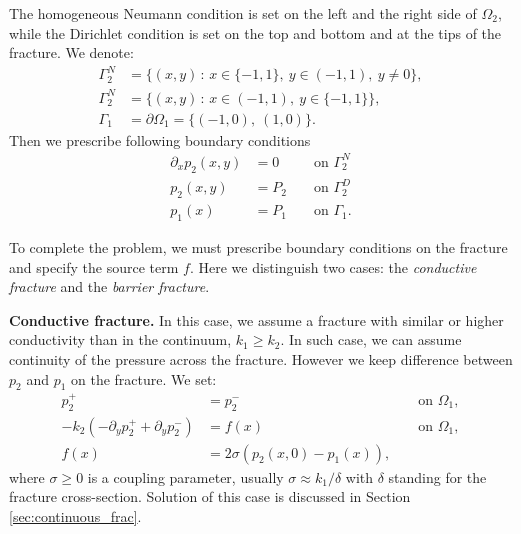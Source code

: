 \documentclass{elsarticle}
\def\prtl{\partial} %
\begin{document}
The homogeneous Neumann condition is set on the left and the right side of $\Omega_2$,
while the Dirichlet condition is set on the top and bottom and at the tips of the fracture.
We denote:
\begin{align*}
   \Gamma^N_2 &= \{(x,y)\, :\, x\in\{-1, 1\},\ y\in (-1, 1),\ y\ne 0\},\\
   \Gamma^N_2 &= \{(x,y)\, :\, x\in (-1, 1),\ y\in \{-1, 1\}\},\\
   \Gamma_1   &= \prtl \Omega_1 = \{(-1, 0),\ (1, 0)\}. 
\end{align*}
Then we prescribe following boundary conditions
\begin{align}
  \label{eq:bc_common}
  \prtl_x p_2(x,y) &= 0  &&\text{ on } \Gamma_2^N\\
  p_2(x,y) &= P_2        &&\text{ on } \Gamma_2^D\\
  p_1(x) &= P_1          &&\text{ on } \Gamma_1.
  \label{eq:bc_1}
\end{align}

To complete the problem, we must prescribe boundary conditions on the fracture and specify the source term $f$. Here we 
distinguish two cases: the \emph{conductive fracture} and the \emph{barrier fracture}.


{\bf Conductive fracture.} In this case, we assume a fracture with similar or higher conductivity than in the continuum, $k_1 \ge k_2$.
In such case, we can assume continuity of the pressure across the fracture. However we keep difference between $p_2$ and $p_1$ on the fracture.
We set:
\begin{align}
  \label{eq:c_coupling_a}
  p_2^+ &= p_2^-                &&\text{ on }\Omega_1,\\
  -k_2 (-\prtl_y p_2^+ + \prtl_y p_2^-) &= f(x)         &&\text{ on }\Omega_1,\\
  f(x) &= 2\sigma (p_2(x,0) - p_1(x)),   &&
  \label{eq:c_coupling_c}
\end{align}
where $\sigma \ge 0$ is a coupling parameter, usually $\sigma \approx k_1 / \delta$ with $\delta$ standing for the fracture cross-section. 
Solution of this case is discussed in Section \ref{sec:continuous_frac}.
\end{document}
